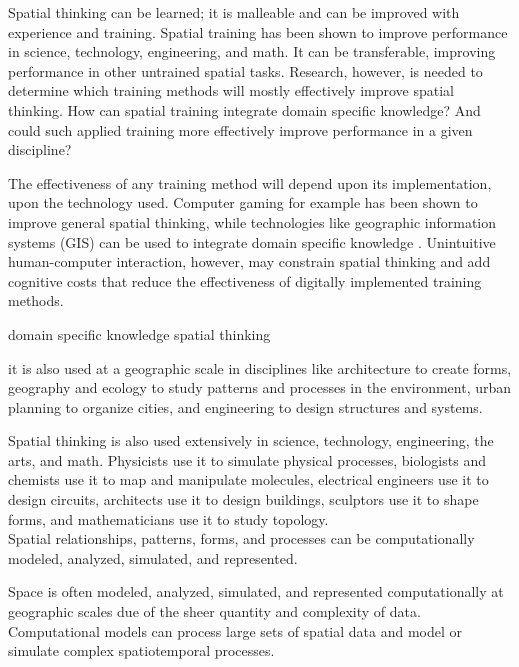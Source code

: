Spatial thinking can be learned; it is malleable and can be improved with experience and training. 
Spatial training has been shown to improve performance in science, technology, engineering, and math. 
It can be transferable, improving performance in other untrained spatial tasks. 
Research, however, is needed to determine which training methods will mostly effectively improve spatial thinking. 
How can spatial training integrate domain specific knowledge? And could such applied training more effectively improve performance in a given discipline? \cite{Uttal2013} 

The effectiveness of any training method will depend upon its implementation, upon the technology used. 
Computer gaming for example has been shown to improve general spatial thinking, while technologies like geographic information systems (GIS) can be used to integrate domain specific knowledge \cite{Uttal2013}.
Unintuitive human-computer interaction, however, may constrain spatial thinking and add cognitive costs that reduce the effectiveness of digitally implemented training methods. 


domain specific knowledge
spatial thinking



it is also used at a geographic scale in disciplines like 
architecture to create forms, 
geography and ecology to study patterns and processes in the environment, 
urban planning to organize cities,
and 
engineering to design structures and systems. %


Spatial thinking is also used extensively in science, technology, engineering, the arts, and math. 
Physicists use it to simulate physical processes,
biologists and chemists use it to map and manipulate molecules,
electrical engineers use it to design circuits, 
architects use it to design buildings, 
sculptors use it to shape forms, 
and mathematicians use it to study topology. \\

Spatial relationships, patterns, forms, and processes can be computationally modeled, analyzed, simulated, and represented. 

Space is often modeled, analyzed, simulated, and represented computationally at geographic scales
due of the sheer quantity and complexity of data. 
Computational models can process large sets of spatial data and model or simulate complex spatiotemporal processes.


